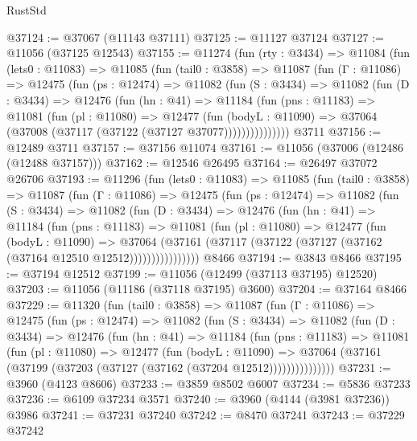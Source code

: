 \begin{lexlean}{RustStd}
\begin{coremodule}
@37124 := @37067 (@11143 @37111)
@37125 := @11127 @37124
@37127 := @11056 (@37125 @12543)
@37155 := @11274
    (fun (rty : @3434) =>
    @11084
      (fun (lets0 : @11083) =>
      @11085
        (fun (tail0 : @3858) =>
        @11087
          (fun (Γ : @11086) =>
          @12475
            (fun (ps : @12474) =>
            @11082
              (fun (S : @3434) =>
              @11082
                (fun (D : @3434) =>
                @12476
                  (fun (hn : @41) =>
                  @11184
                    (fun (pns : @11183) =>
                    @11081
                      (fun (pl : @11080) =>
                      @12477
                        (fun (bodyL : @11090) =>
                        @37064 (@37008 (@37117 (@37122 (@37127 @37077)))))))))))))))
    @3711
@37156 := @12489 @3711
@37157 := @37156 @11074
@37161 := @11056 (@37006 (@12486 (@12488 @37157)))
@37162 := @12546 @26495
@37164 := @26497 @37072 @26706
@37193 := @11296
    (fun (lets0 : @11083) =>
    @11085
      (fun (tail0 : @3858) =>
      @11087
        (fun (Γ : @11086) =>
        @12475
          (fun (ps : @12474) =>
          @11082
            (fun (S : @3434) =>
            @11082
              (fun (D : @3434) =>
              @12476
                (fun (hn : @41) =>
                @11184
                  (fun (pns : @11183) =>
                  @11081
                    (fun (pl : @11080) =>
                    @12477
                      (fun (bodyL : @11090) =>
                      @37064
                        (@37161
                          (@37117 (@37122 (@37127 (@37162 (@37164 @12510 @12512))))))))))))))))
    @8466
@37194 := @3843 @8466
@37195 := @37194 @12512
@37199 := @11056 (@12499 (@37113 @37195) @12520)
@37203 := @11056 (@11186 (@37118 @37195) @3600)
@37204 := @37164 @8466
@37229 := @11320
    (fun (tail0 : @3858) =>
    @11087
      (fun (Γ : @11086) =>
      @12475
        (fun (ps : @12474) =>
        @11082
          (fun (S : @3434) =>
          @11082
            (fun (D : @3434) =>
            @12476
              (fun (hn : @41) =>
              @11184
                (fun (pns : @11183) =>
                @11081
                  (fun (pl : @11080) =>
                  @12477
                    (fun (bodyL : @11090) =>
                    @37064 (@37161 (@37199 (@37203 (@37127 (@37162 (@37204 @12512)))))))))))))))
@37231 := @3960 (@4123 @8606)
@37233 := @3859 @8502 @6007
@37234 := @5836 @37233
@37236 := @6109 @37234 @3571
@37240 := @3960 (@4144 (@3981 @37236)) @3986
@37241 := @37231 @37240
@37242 := @8470 @37241
@37243 := @37229 @37242

\end{coremodule}
\end{lexlean}
